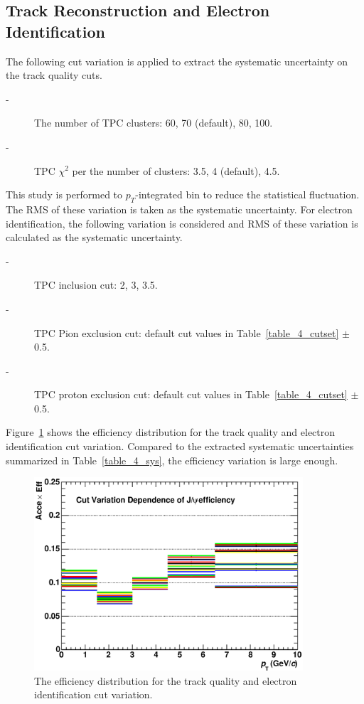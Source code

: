 \subsection{Track Reconstruction and Electron Identification}
The following cut variation is applied to extract the systematic uncertainty on the track quality cuts. 
\begin{description}
  \item[-] The number of TPC clusters: 60, 70 (default),  80, 100.
  \item[-] TPC $\chi^{2}$ per the number of clusters: 3.5, 4 (default), 4.5.
\end{description}
This study is performed to $p_{T}$-integrated bin to reduce the statistical fluctuation. 
The RMS of these variation is taken as the systematic uncertainty. 
For electron identification, the following variation is considered and RMS of these variation is calculated as the systematic uncertainty.
\begin{description}
  \item[-] TPC inclusion cut: 2, 3, 3.5. 
  \item[-] TPC Pion exclusion cut: default cut values in Table~\ref{table_4_cutset} $\pm$ 0.5. 
  \item[-] TPC proton exclusion cut: default cut values in Table~\ref{table_4_cutset} $\pm$ 0.5.
\end{description}
Figure~\ref{fig_4_cutvariation} shows the efficiency distribution for the track quality and electron identification cut variation. 
Compared to the extracted systematic uncertainties summarized in Table~\ref{table_4_sys}, the efficiency variation is large enough. 
\begin{figure}[!h]
	\centering
	 \includegraphics[width=10cm]{chap4/figure/Systematics/Variation/PIDCutVariationStudy_LHC13d10.eps}
	\caption{The efficiency distribution for the track quality and electron identification cut variation.  }
	\label{fig_4_cutvariation}
\end{figure}

